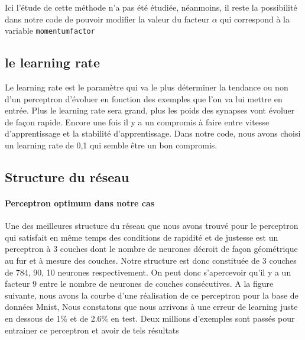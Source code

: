 \documentclass[a4paper,oneside]{report}
\begin{document}
 Ici l'étude de cette méthode n'a pas été étudiée, néanmoins, il reste la possibilité dans notre code de pouvoir modifier la valeur du facteur $\alpha$ qui correspond à la variable \texttt{momentumfactor} 
 
 
 \subsection{le learning rate}
 Le learning rate est le paramètre qui va le plus déterminer la tendance ou non d'un perceptron d'évoluer en fonction des exemples que l'on va lui mettre en entrée. Plus le learning rate sera grand, plus les poids des 
synapses vont évoluer de façon rapide. Encore une fois il y a un compromis à faire entre vitesse d'apprentissage et la stabilité d'apprentissage. Dans notre code, nous avons choisi un learning rate de 0,1 qui semble être un bon compromis.

\newpage
\subsection{Structure du réseau}

\paragraph{Perceptron optimum dans notre cas}

Une des meilleures structure du réseau que nous avons trouvé pour le perceptron qui satisfait en même temps des conditions de rapidité et de justesse est un perceptron à 3 couches dont le nombre de neurones décroit de façon géométrique au fur et à mesure des couches. Notre structure est donc constituée de 3 couches de 784, 90, 10 neurones respectivement. On peut donc s'apercevoir qu'il y a un facteur 9 entre le nombre de neurones de couches consécutives. A la figure suivante, nous avons la courbe d'une réalisation de ce perceptron pour la base de données Mnist, Nous constatons que nous arrivons à une erreur de learning juste en dessous de 1\% et de 2.6\% en test. Deux millions d'exemples sont passés pour entrainer ce perceptron et avoir de tels résultats
\end{document}

